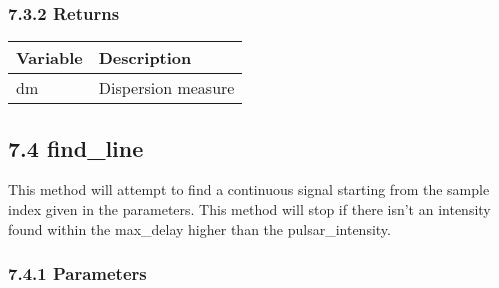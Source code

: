 \documentclass[]{article}
\begin{document}
\subsubsection{7.3.2 Returns}\label{returns-2}

\begin{longtable}[]{@{}ll@{}}
\toprule
Variable & Description\tabularnewline
\midrule
\endhead
dm & Dispersion measure\tabularnewline
\bottomrule
\end{longtable}

\subsection{7.4 find\_line}\label{find_line}

This method will attempt to find a continuous signal starting from the
sample index given in the parameters. This method will stop if there
isn't an intensity found within the max\_delay higher than the
pulsar\_intensity.

\subsubsection{7.4.1 Parameters}\label{parameters-6}
\end{document}
